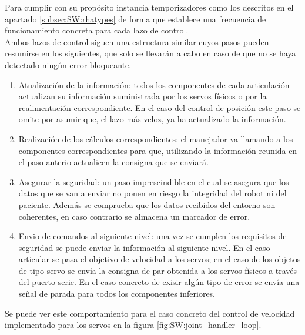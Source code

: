         Para cumplir con su propósito instancia temporizadores como los descritos en el apartado \ref{subsec:SW:rhatypes} de forma que establece una frecuencia de funcionamiento concreta para cada lazo de control.
        \\
        
        Ambos lazos de control siguen una estructura similar cuyos pasos pueden resumirse en los siguientes, que solo se llevarán a cabo en caso de que no se haya detectado ningún error bloqueante.
        \begin{enumerate}
            \item Atualización de la información: todos los componentes de cada articulación actualizan su información suministrada por los servos físicos o por la realimentación correspondiente. En el caso del control de posición este paso se omite por asumir que, el lazo más veloz, ya ha actualizado la información.
            \item Realización de los cálculos correspondientes: el manejador va llamando a los componentes correspondientes para que, utilizando la información reunida en el paso anterio actualicen la consigna que se enviará.
            \item Asegurar la seguridad: un paso imprescindible en el cual se asegura que los datos que se van a enviar no ponen en riesgo la integridad del robot ni del paciente. Además se comprueba que los datos recibidos del entorno son coherentes, en caso contrario se almacena un marcador de error.
            \item Envio de comandos al siguiente nivel: una vez se cumplen los requisitos de seguridad se puede enviar la información al siguiente nivel. En el caso articular se pasa el objetivo de velocidad a los servos; en el caso de los objetos de tipo servo se envía la consigna de par obtenida a los servos físicos a través del puerto serie. En el caso concreto de exisir algún tipo de error se envía una señal de parada para todos los componentes inferiores.
        \end{enumerate}
        Se puede ver este comportamiento para el caso concreto del control de velocidad implementado para los servos en la figura \ref{fig:SW:joint_handler_loop}.

